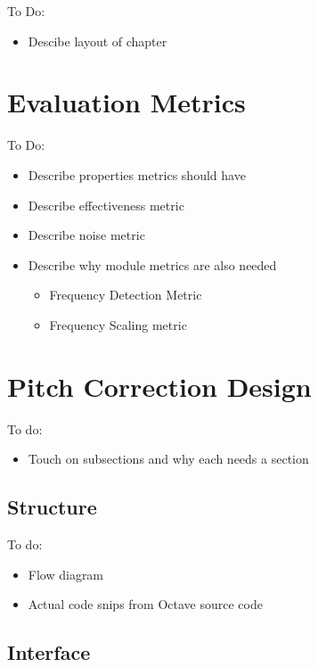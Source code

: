 
\color{red}
To Do:
\begin{itemize}
	\item Descibe layout of chapter
\end{itemize}
\color{black}

\section{Evaluation Metrics}

\color{red}
To Do:
\begin{itemize}
	\item Describe properties metrics should have
	\item Describe effectiveness metric
	\item Describe noise metric
	\item Describe why module metrics are also needed
	\begin{itemize}
		\item Frequency Detection Metric
		\item Frequency Scaling metric
	\end{itemize}
\end{itemize}
\color{black}

\section{Pitch Correction Design}

\color{red}
To do:
\begin{itemize}
	\item Touch on subsections and why each needs a section
\end{itemize}
\color{black}

\subsection{Structure}

\color{red}
To do:
\begin{itemize}
	\item Flow diagram
	\item Actual code snips from Octave source code
\end{itemize}
\color{black}

\subsection{Interface}

